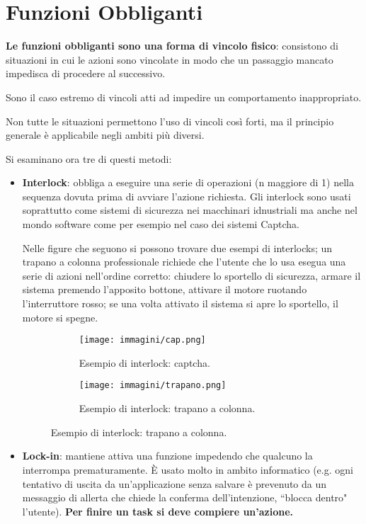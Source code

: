\section{Funzioni Obbliganti}
\textbf{Le funzioni obbliganti sono una forma di vincolo fisico}: consistono di situazioni in cui le azioni sono vincolate in modo che un passaggio
mancato impedisca di procedere al successivo.

Sono il caso estremo di vincoli atti ad impedire un comportamento inappropriato.

Non tutte le situazioni permettono l'uso di vincoli così forti, ma il principio generale è applicabile negli ambiti più diversi.

Si esaminano ora tre di questi metodi:
\begin{itemize}
	\item \textbf{Interlock}: obbliga a eseguire una serie di operazioni (n maggiore di 1) nella sequenza dovuta prima di avviare l'azione richiesta.
	Gli interlock sono usati soprattutto come sistemi di sicurezza nei macchinari idnustriali ma anche nel mondo software come per esempio nel caso dei
	sistemi Captcha.

	Nelle figure che seguono si possono trovare due esempi di interlocks; un trapano a colonna professionale richiede che l'utente che lo usa esegua
	una serie di azioni nell'ordine corretto: chiudere lo sportello di sicurezza, armare il sistema premendo l'apposito bottone, attivare il motore
	ruotando l'interruttore rosso; se una volta attivato il sistema si apre lo sportello, il motore si spegne.
	
	\begin{figure}[h!]
		\begin{subfigure}{0.49 \linewidth} \centering
			\texttt{[image: immagini/cap.png]}
			\caption{Esempio di interlock: captcha.}
		\end{subfigure}
		\begin{subfigure}{0.49 \linewidth} \centering
			\texttt{[image: immagini/trapano.png]}
			\caption{Esempio di interlock: trapano a colonna.}
		\end{subfigure}
	\end{figure}

	\item \textbf{Lock-in}: mantiene attiva una funzione impedendo che qualcuno la interrompa prematuramente. È usato molto in ambito informatico (e.g.
	ogni tentativo di uscita da un'applicazione senza salvare è prevenuto da un messaggio di allerta che chiede la conferma dell'intenzione, ``blocca
	dentro" l'utente). \textbf{Per finire un task si deve compiere un'azione.}
	

\end{itemize}
